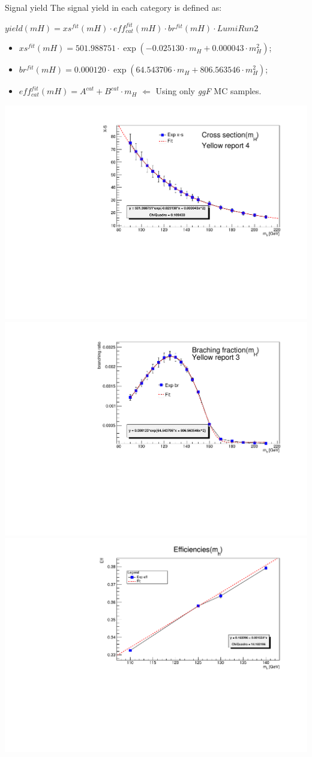 \documentclass[10pt,UKenglish, leqno, xcolor = dvipsnames]{beamer}
\begin{document}
	\begin{frame}{Signal yield}
		\vfill
		The signal yield in each category is defined as:
		\begin{center}
			$yield(mH) = xs^{fit}(mH) \cdot eff^{fit}_{cat}(mH) \cdot br^{fit}(mH) \cdot LumiRun2$
		\end{center}
		\begin{itemize}
			\small
			\item $xs^{fit}(mH) = 501.988751\cdot\exp(-0.025130\cdot m_{H} + 0.000043\cdot m_{H}^2)$;
			\item $br^{fit}(mH) = 0.000120\cdot\exp(64.543706\cdot m_{H} + 806.563546\cdot m_{H}^2)$;
			\item $eff^{fit}_{cat}(mH) = A^{cat} + B^{cat}\cdot m_{H}$ $\Leftarrow$ Using only \textit{ggF} MC samples.
			
		\end{itemize}
		\vspace{.5cm}
			\includegraphics[width=.32\textwidth]{Pres_Images/x_section_fit.pdf}
			\includegraphics[width=.32\textwidth]{Pres_Images/br_fit.pdf}
			\includegraphics[width=.32\textwidth]{Pres_Images/efficiencies_fit_1.pdf}
		\vfill
	\end{frame}
\end{document}
